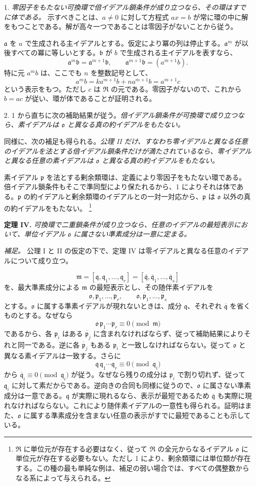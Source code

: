\documentclass[11pt]{article}
\providecommand{\mR}{\mathfrak{R}}
\providecommand{\mbar}[1]{\overline{#1}}
\providecommand{\ma}{\mathfrak{a}}
\providecommand{\mb}{\mathfrak{b}}
\providecommand{\mm}{\mathfrak{m}}
\providecommand{\mo}{\mathfrak{o}}
\providecommand{\mpideal}{\mathfrak{p}}
\providecommand{\mq}{\mathfrak{q}}
\begin{document}
1. \emph{零因子をもたない可換環で倍イデアル鎖条件が成り立つなら、その環はすでに体である。} 示すべきことは、$a\ne0$ に対して方程式 $ax=b$ が常に環の中に解をもつことである。解が高々一つであることは零因子がないことから従う。

$\ma$ を $a$ で生成される主イデアルとする。仮定により冪の列は停止する。$\ma^m$ が以後すべての冪に等しいとする。$\mb$ が $b$ で生成される主イデアルを表すなら、
\[
        \ma^m\mb=\ma^{m+1}\mb,
        \qquad \ma^{m+1}\mb=(a^{m+1}b).
\]
特に元 $a^m b$ は、ここでも $n$ を整数記号として、
\[
        a^m b=k a^{m+1}b+n a^{m+1}b=a^{m+1}c
\]
という表示をもつ。ただし $c$ は $\mR$ の元である。零因子がないので、これから $b=ac$ が従い、環が体であることが証明される。

2. 1 から直ちに次の補助結果が従う。\emph{倍イデアル鎖条件が可換環で成り立つなら、素イデアルは $\mo$ と異なる真の約イデアルをもたない。}

同様に、次の補足も得られる。\emph{公理 II だけ、すなわち零イデアルと異なる任意のイデアルを法とする倍イデアル鎖条件だけが満たされているなら、零イデアルと異なる任意の素イデアルは $\mo$ と異なる真の約イデアルをもたない。}

素イデアル $\mpideal$ を法とする剰余類環は、定義により零因子をもたない環である。倍イデアル鎖条件もそこで準同型により保たれるから、1 によりそれは体である。$\mpideal$ の約イデアルと剰余類環のイデアルとの一対一対応から、$\mpideal$ は $\mo$ 以外の真の約イデアルをもたない。
\footnote{$\mR$ に単位元が存在する必要はなく、従って $\mR$ の全元からなるイデアル $\mo$ に単位元が存在する必要もない。ただし 1 により、剰余類環には単位類が存在する。この種の最も単純な例は、補足の弱い場合では、すべての偶整数からなる系によって与えられる。}

\textbf{定理 IV.} \emph{可換環で二重鎖条件が成り立つなら、任意のイデアルの最短表示において、単位イデアル $\mo$ に属さない準素成分は一意に定まる。}

\emph{補足。} 公理 I と II の仮定の下で、定理 IV は零イデアルと異なる任意のイデアルについて成り立つ。

\[
        \mm=[\mq,\mq_1,\ldots,\mq_r]=[\mbar\mq,\mbar\mq_1,\ldots,\mbar\mq_s]
\]
を、最大準素成分による $\mm$ の最短表示とし、その随伴素イデアルを
\[
        \mo,\mpideal_1,\ldots,\mpideal_r,
        \qquad \mo,\mbar\mpideal_1,\ldots,\mbar\mpideal_s
\]
とする。$\mo$ に属する準素イデアルが現れないときは、成分 $\mq$、それぞれ $\mbar\mq$ を省くものとする。なぜなら
\[
        \mo\,\mpideal_1\cdots\mpideal_r\equiv0\pmod{\mm}
\]
であるから、各 $\mpideal_i$ はある $\mbar\mpideal_j$ に含まれなければならず、従って補助結果によりそれと同一である。逆に各 $\mbar\mpideal_j$ もある $\mpideal_i$ と一致しなければならない。従って $\mo$ と異なる素イデアルは一致する。さらに
\[
        \mq\,\mq_1\cdots\mq_r\equiv0\pmod{\mq_i}
\]
から $\mbar\mq_i\equiv0\pmod{\mq_i}$ が従う。なぜなら残りの成分は $\mpideal_i$ で割り切れず、従って $\mq_i$ に対して素だからである。逆向きの合同も同様に従うので、$\mo$ に属さない準素成分は一意である。$\mq$ が実際に現れるなら、表示が最短であるため $\mbar\mq$ も実際に現れなければならない。これにより随伴素イデアルの一意性も得られる。証明はまた、$\mo$ に属する準素成分を含まない任意の表示がすでに最短であることも示している。
\end{document}
